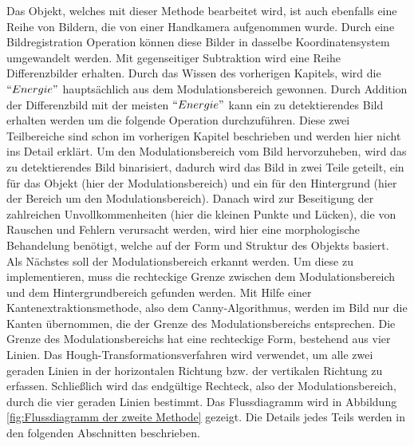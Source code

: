 Das Objekt, welches mit dieser Methode bearbeitet wird, ist auch ebenfalls eine Reihe von Bildern, die von einer Handkamera aufgenommen wurde. Durch eine Bildregistration Operation können diese Bilder in dasselbe Koordinatensystem umgewandelt werden. Mit gegenseitiger Subtraktion wird eine Reihe Differenzbilder erhalten. Durch das Wissen des vorherigen Kapitels, wird die $``Energie"$ hauptsächlich aus dem Modulationsbereich gewonnen. Durch Addition der Differenzbild mit der meisten $``Energie"$ kann ein zu detektierendes Bild erhalten werden um die folgende Operation durchzuführen. Diese zwei Teilbereiche sind schon im vorherigen Kapitel beschrieben und werden hier nicht ins Detail erklärt. Um den Modulationsbereich vom Bild hervorzuheben, wird das zu detektierendes Bild binarisiert, dadurch wird das Bild in zwei Teile geteilt, ein für das Objekt (hier der Modulationsbereich) und ein für den Hintergrund (hier der Bereich um den Modulationsbereich). Danach wird zur Beseitigung der zahlreichen Unvollkommenheiten (hier die kleinen Punkte und Lücken), die von Rauschen und Fehlern verursacht werden, wird hier eine morphologische Behandelung benötigt, welche auf der Form und Struktur des Objekts basiert. Als Nächstes soll der Modulationsbereich erkannt werden. Um diese zu implementieren, muss die rechteckige Grenze zwischen dem Modulationsbereich und dem Hintergrundbereich gefunden werden. Mit Hilfe einer Kantenextraktionsmethode, also dem Canny-Algorithmus, werden im Bild nur die Kanten übernommen, die der Grenze des Modulationsbereichs entsprechen. Die Grenze des Modulationsbereichs hat eine rechteckige Form, bestehend aus vier Linien. Das Hough-Transformationsverfahren wird verwendet, um alle zwei geraden Linien in der horizontalen Richtung bzw. der vertikalen Richtung zu erfassen. Schließlich wird das endgültige Rechteck, also der Modulationsbereich, durch die vier geraden Linien bestimmt. Das Flussdiagramm wird in Abbildung \ref{fig:Flussdiagramm der zweite Methode} gezeigt. Die Details jedes Teils werden in den folgenden Abschnitten beschrieben.

